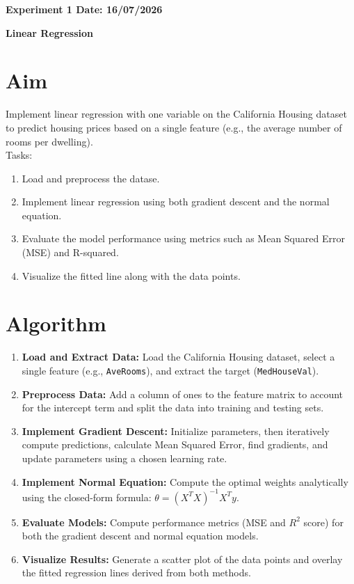 \documentclass[12pt, a4paper]{report}
\date{}
\begin{document}

\begin{center}
	\bfseries 
	Experiment 1 \hfill Date: 16/07/2026
\end{center}


\begin{center}
{\bfseries \Huge Linear Regression}	
\end{center}


\section*{Aim}
Implement linear regression with one variable on the California Housing dataset to predict housing prices based on a single feature (e.g., the average number of rooms per dwelling).  \\
Tasks:
\begin{enumerate}[\quad -]
\itemsep 0em 

\item Load and preprocess the datase.
\item Implement linear regression using both gradient descent and the normal equation.
\item Evaluate the model performance using metrics such as Mean Squared Error (MSE) and R-squared.
\item Visualize the fitted line along with the data points.
\end{enumerate}

\section*{Algorithm} 

\begin{enumerate}
	\itemsep 0em
	\item \textbf{Load and Extract Data:} Load the California Housing dataset, select a single feature (e.g., \texttt{AveRooms}), and extract the target (\texttt{MedHouseVal}).
	\item \textbf{Preprocess Data:} Add a column of ones to the feature matrix to account for the intercept term and split the data into training and testing sets.
	\item \textbf{Implement Gradient Descent:} Initialize parameters, then iteratively compute predictions, calculate Mean Squared Error, find gradients, and update parameters using a chosen learning rate.
	\item \textbf{Implement Normal Equation:} Compute the optimal weights analytically using the closed-form formula: $\theta = (X^T X)^{-1} X^T y$.
	\item \textbf{Evaluate Models:} Compute performance metrics (MSE and $R^2$ score) for both the gradient descent and normal equation models.
	\item \textbf{Visualize Results:} Generate a scatter plot of the data points and overlay the fitted regression lines derived from both methods.
\end{enumerate}
\end{document}
